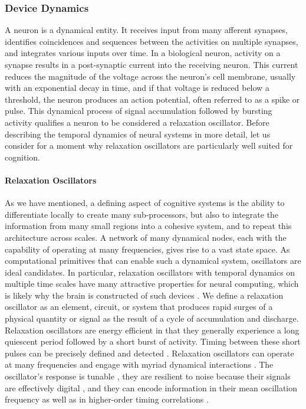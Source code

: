 \subsubsection{Device Dynamics}
A neuron is a dynamical entity. It receives input from many afferent synapses, identifies coincidences and sequences between the activities on multiple synapses, and integrates various inputs over time. In a biological neuron, activity on a synapse results in a post-synaptic current into the receiving neuron. This current reduces the magnitude of the voltage across the neuron's cell membrane, usually with an exponential decay in time, and if that voltage is reduced below a threshold, the neuron produces an action potential, often referred to as a spike or pulse. This dynamical process of signal accumulation followed by bursting activity qualifies a neuron to be considered a relaxation oscillator. Before describing the temporal dynamics of neural systems in more detail, let us consider for a moment why relaxation oscillators are particularly well suited for cognition.

\paragraph{Relaxation Oscillators}
As we have mentioned, a defining aspect of cognitive systems is the ability to differentiate locally to create many sub-processors, but also to integrate the information from many small regions into a cohesive system, and to repeat this architecture across scales. A network of many dynamical nodes, each with the capability of operating at many frequencies, gives rise to a vast state space. As computational primitives that can enable such a dynamical system, oscillators are ideal candidates. In particular, relaxation oscillators \cite{st2015,mist1990,soko1993,lued1997,huya2000,bu2006,gile2011,vepe1968,cacl1981} with temporal dynamics on multiple time scales \cite{soko1993} have many attractive properties for neural computing, which is likely why the brain is constructed of such devices \cite{ll1988}. We define a relaxation oscillator as an element, circuit, or system that produces rapid surges of a physical quantity or signal as the result of a cycle of accumulation and discharge. Relaxation oscillators are energy efficient in that they generally experience a long quiescent period followed by a short burst of activity. Timing between these short pulses can be precisely defined and detected \cite{bu2006}. Relaxation oscillators can operate at many frequencies \cite{huya2000,more} and engage with myriad dynamical interactions \cite{lued1997}. The oscillator's response is tunable \cite{huya2000}, they are resilient to noise because their signals are effectively digital \cite{stgo2005}, and they can encode information in their mean oscillation frequency as well as in higher-order timing correlations \cite{pasc1999,thde2001,sase2001,stse2007,brcl2010,haah2015}.

